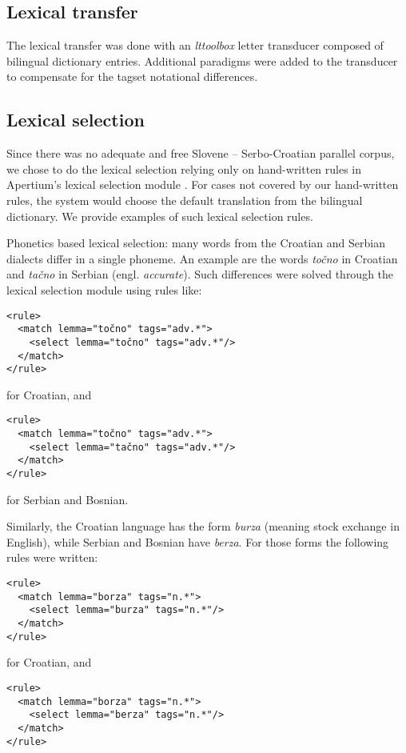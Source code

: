 \subsection{Lexical transfer}
The lexical transfer was done with an \emph{lttoolbox} letter
transducer composed of bilingual dictionary entries. Additional
paradigms were added to the transducer to compensate for the tagset
notational differences.

\subsection{Lexical selection}

Since there was no adequate and free Slovene -- Serbo-Croatian parallel corpus, 
we chose to do the lexical selection relying only on hand-written rules in 
Apertium's lexical selection module \cite{tyers12}.
For cases not covered by our hand-written rules, the system would choose the 
default translation from the bilingual dictionary.
We provide examples of such lexical selection rules.

Phonetics based lexical selection: many words from the Croatian and Serbian dialects differ in a single phoneme.
An example are the words \emph{točno} in Croatian and \emph{tačno} in Serbian (engl. \emph{accurate}).
Such differences were solved through the lexical selection module using rules like:

{\small
\begin{Verbatim}
<rule>
  <match lemma="točno" tags="adv.*">
    <select lemma="točno" tags="adv.*"/>
  </match>
</rule>
\end{Verbatim}
}
for Croatian, and
{\small
\begin{Verbatim}
<rule>
  <match lemma="točno" tags="adv.*">
    <select lemma="tačno" tags="adv.*"/>
  </match>
</rule>
\end{Verbatim}
}
for Serbian and Bosnian.

Similarly, the Croatian language has the form \emph{burza} (meaning stock exchange in English), while Serbian and Bosnian have \emph{berza}. 
For those forms the following rules were written:

{\small
\begin{Verbatim}
<rule>
  <match lemma="borza" tags="n.*">
    <select lemma="burza" tags="n.*"/>
  </match>
</rule>
\end{Verbatim}
}
for Croatian, and 
{\small
\begin{Verbatim}
<rule>
  <match lemma="borza" tags="n.*">
    <select lemma="berza" tags="n.*"/>
  </match>
</rule>

\end{Verbatim}
}

